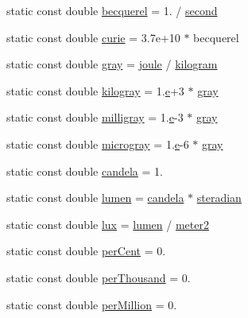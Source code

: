 \begin{DoxyCompactItemize}
static const double \hyperlink{namespacedd4hep_a3c71f55bed97c3b05c92c0b81b3bb17e}{becquerel} = 1. / \hyperlink{namespacedd4hep_ac03364576705a245265d8ed6ea26b871}{second}
\item 
static const double \hyperlink{namespacedd4hep_a024c7af7439282d20567717fbdae08bb}{curie} = 3.\+7e+10 $\ast$ becquerel
\item 
static const double \hyperlink{namespacedd4hep_a35738d027f0d6649943f74cfc26bb7fc}{gray} = \hyperlink{namespacedd4hep_a8cdc11c61e5f953baede59569544a324}{joule} / \hyperlink{namespacedd4hep_a94c5d58440a5bf3d43b1edaa51ae5294}{kilogram}
\item 
static const double \hyperlink{namespacedd4hep_a865c3d39459c3a51f6ac00236482908a}{kilogray} = 1.\hyperlink{_volumes_8cpp_a8a9a1f93e9b09afccaec215310e64142}{e}+3 $\ast$ \hyperlink{namespacedd4hep_a35738d027f0d6649943f74cfc26bb7fc}{gray}
\item 
static const double \hyperlink{namespacedd4hep_abc834abd0eb01594746cfdfd7b91104d}{milligray} = 1.\hyperlink{_volumes_8cpp_a8a9a1f93e9b09afccaec215310e64142}{e}-\/3 $\ast$ \hyperlink{namespacedd4hep_a35738d027f0d6649943f74cfc26bb7fc}{gray}
\item 
static const double \hyperlink{namespacedd4hep_a3d5d57424aedb6753f4c4a9ad998b722}{microgray} = 1.\hyperlink{_volumes_8cpp_a8a9a1f93e9b09afccaec215310e64142}{e}-\/6 $\ast$ \hyperlink{namespacedd4hep_a35738d027f0d6649943f74cfc26bb7fc}{gray}
\item 
static const double \hyperlink{namespacedd4hep_ad6c9a17d1f654cad2f47f590edc1bec4}{candela} = 1.
\item 
static const double \hyperlink{namespacedd4hep_aca4ed36739bef9c651a4ced5a2279b40}{lumen} = \hyperlink{namespacedd4hep_ad6c9a17d1f654cad2f47f590edc1bec4}{candela} $\ast$ \hyperlink{namespacedd4hep_a0a902cdeced2ad28da2d32515e540867}{steradian}
\item 
static const double \hyperlink{namespacedd4hep_a1c9daf57c558025c205072d26d477a99}{lux} = \hyperlink{namespacedd4hep_aca4ed36739bef9c651a4ced5a2279b40}{lumen} / \hyperlink{namespacedd4hep_afe718b0d811af6b4d45c556e3a0e87a3}{meter2}
\item 
static const double \hyperlink{namespacedd4hep_a403b2fd7b19ff0bf0a3803d7907bf84a}{per\+Cent} = 0.
\item 
static const double \hyperlink{namespacedd4hep_ab0f604563df4dec531bdb35bd2f97a6f}{per\+Thousand} = 0.
\item 
static const double \hyperlink{namespacedd4hep_a3c86fbb277949a5ee64673266d8f9f93}{per\+Million} = 0.

\end{DoxyCompactItemize}
